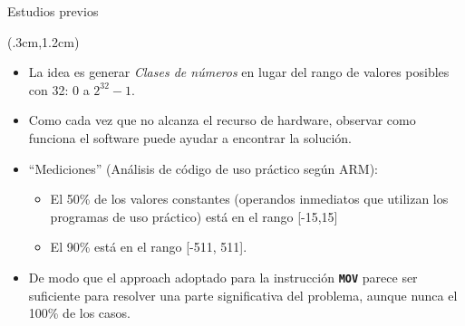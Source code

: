 \documentclass[usenames,table,dvipsnames,aspectratio=169]{beamer}
\begin{document}
\begin{frame}{Estudios previos}
 \begin{textblock*}{\textwidth}(.3cm,1.2cm)
  \begin{itemize}[<+(1)->] \justifying \parskip 0.3cm
   \item La idea es generar \textit{Clases de números} en lugar del rango de valores posibles con \SI{32}{\bit}: 0 a $2^{32}-1$.
   \item Como cada vez que no alcanza el recurso de hardware, observar como funciona el software puede ayudar a encontrar la solución.
   \item ``Mediciones'' (Análisis de código de uso práctico según ARM):
   \begin{itemize} \justifying \parskip 0.3cm
    \item El 50\% de los valores constantes (operandos inmediatos que utilizan los programas de uso práctico) está en el rango [-15,15]
    \item El 90\% está en el rango [-511, 511].
   \end{itemize}
   \item De modo que el approach adoptado para la instrucción \textbf{\texttt{MOV}} parece ser suficiente para resolver una parte significativa del problema, aunque nunca el 100\% de los casos.
  \end{itemize}
 \end{textblock*}
\end{frame}
\end{document}
